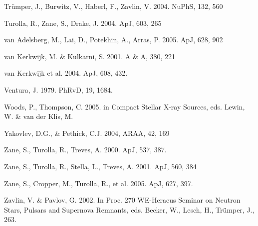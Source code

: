 \documentclass[useAMS,onecolumn,usenatbib,usegraphicx]{mn2e}
\begin{document}
\begin{thebibliography}{}
Tr\"umper, J., Burwitz, V., Haberl, F., Zavlin, V. 2004. NuPhS, 132, 560

Turolla, R., Zane, S., Drake, J. 2004. ApJ, 603, 265

van Adelsberg, M., Lai, D., Potekhin, A., Arras, P. 2005. ApJ, 628, 902

van Kerkwijk, M. \& Kulkarni, S. 2001. A \& A, 380, 221

van Kerkwijk et al. 2004. ApJ, 608, 432.

Ventura, J. 1979. PhRvD, 19, 1684.

Woods, P., Thompson, C. 2005. in Compact Stellar X-ray Sources, eds. Lewin, W. \& 
van der Klis, M.

Yakovlev, D.G., \& Pethick, C.J. 2004, ARAA, 42, 169

Zane, S., Turolla, R., Treves, A. 2000. ApJ, 537, 387.

Zane, S., Turolla, R., Stella, L., Treves, A. 2001. ApJ, 560, 384

Zane, S., Cropper, M., Turolla, R., et al. 2005. ApJ, 627, 397.

Zavlin, V. \& Pavlov, G.  2002.  In Proc. 270 WE-Heraeus Seminar on Neutron Stars, Pulsars and Supernova 
Remnants, eds. Becker, W., Lesch, H., Tr\"umper, J., 263.

\label{lastpage}
\end{thebibliography}
\end{document}
